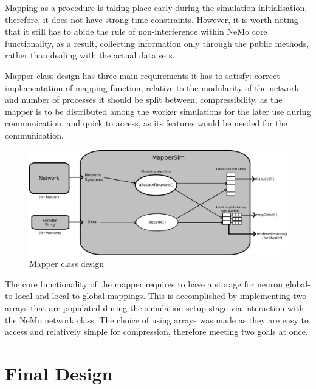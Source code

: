 Mapping as a procedure is taking place early during the simulation initialisation, therefore, it does not have strong time constraints. However, it is worth noting that it still has to abide the rule of non-interference within NeMo core functionality, as a result, collecting information only through the public methods, rather than dealing with the actual data sets.

Mapper class design has three main requirements it has to satisfy: correct implementation of mapping function, relative to the modularity of the network and number of processes it should be split between, compressibility, as the mapper is to be distributed among the worker simulations for the later use during communication, and quick to access, as its features would be needed for the communication.

\begin{figure}[h]
\begin{center}
\includegraphics[scale = 0.4]{images/mapper_design.png}
\end{center}
\caption{Mapper class design}
\end{figure}

The core functionality of the mapper requires to have a storage for neuron global-to-local and local-to-global mappings. This is accomplished by implementing two arrays that are populated during the simulation setup stage via interaction with the NeMo network class. The choice of using arrays was made as they are easy to access and relatively simple for compression, therefore meeting two goals at once.

\clearpage

\section{Final Design}

